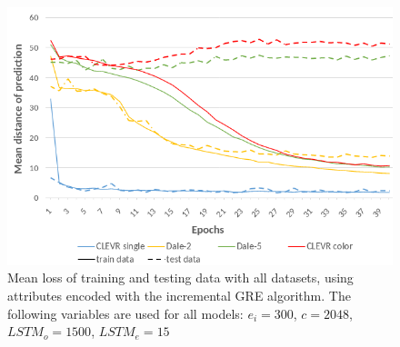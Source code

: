 \begin{figure}[ht]
    \centering
    \includegraphics[width=0.8\linewidth]{figures/coordinate-predictor_loss.png}
    \caption{Mean loss of training and testing data with all datasets, using attributes encoded with the incremental GRE algorithm. The following variables are used for all models: $e_i=300$, $c=2048$, $LSTM_o=1500$, $LSTM_e=15$}
    \label{fig:coordinate-predictor_loss}
\end{figure}

